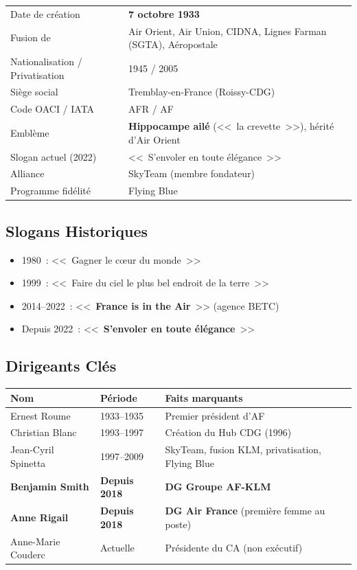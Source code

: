 \documentclass[11pt,a4paper]{article}
\begin{document}
\begin{tabular}{p{4.5cm}p{10cm}}
\toprule
Date de création & \textbf{7 octobre 1933} \\
Fusion de & Air Orient, Air Union, CIDNA, Lignes Farman (SGTA), Aéropostale \\
Nationalisation / Privatisation & 1945 / 2005 \\
Siège social & Tremblay-en-France (Roissy-CDG) \\
Code OACI / IATA & AFR / AF \\
Emblème & \textbf{Hippocampe ailé} (<<~la crevette~>>), hérité d'Air Orient \\
Slogan actuel (2022) & <<~S'envoler en toute élégance~>> \\
Alliance & SkyTeam (membre fondateur) \\
Programme fidélité & Flying Blue \\
\bottomrule
\end{tabular}

\subsection{Slogans Historiques}
\begin{itemize}[nosep]
\item 1980~: <<~Gagner le c\oe ur du monde~>>
\item 1999~: <<~Faire du ciel le plus bel endroit de la terre~>>
\item 2014--2022~: <<~\textbf{France is in the Air}~>> (agence BETC)
\item Depuis 2022~: <<~\textbf{S'envoler en toute élégance}~>>
\end{itemize}

\subsection{Dirigeants Clés}

\begin{tabular}{p{4cm}p{2.5cm}p{8cm}}
\toprule
\textbf{Nom} & \textbf{Période} & \textbf{Faits marquants} \\
\midrule
Ernest Roume & 1933--1935 & Premier président d'AF \\
Christian Blanc & 1993--1997 & Création du Hub CDG (1996) \\
Jean-Cyril Spinetta & 1997--2009 & SkyTeam, fusion KLM, privatisation, Flying Blue \\
\rowcolor{aflight}
\textbf{Benjamin Smith} & \textbf{Depuis 2018} & \textbf{DG Groupe AF-KLM} \\
\rowcolor{aflight}
\textbf{Anne Rigail} & \textbf{Depuis 2018} & \textbf{DG Air France} (première femme au poste) \\
Anne-Marie Couderc & Actuelle & Présidente du CA (non exécutif) \\
\bottomrule
\end{tabular}
\end{document}

